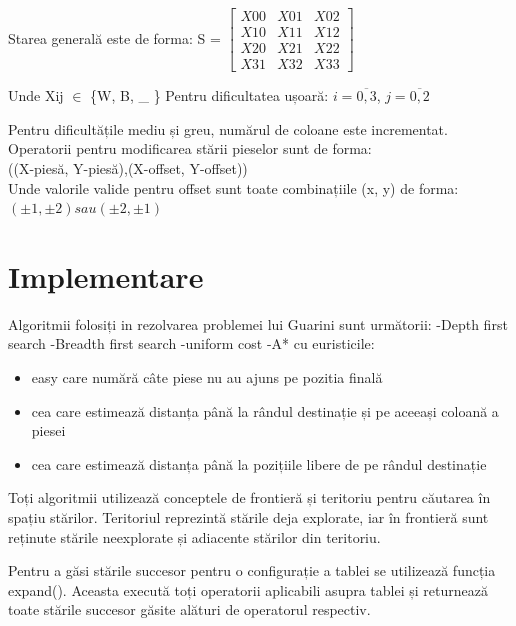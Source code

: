 \documentclass{article}
\begin{document}
    Starea generală este de forma: S =
    $\begin{bmatrix} 
    X00 & X01 & X02\\
    X10 & X11 & X12\\
    X20 & X21 & X22\\
    X31 & X32 & X33
    \end{bmatrix}$
    
    Unde Xij $\in$ \{W, B, \_ \} 
    Pentru dificultatea ușoară: $i=\overline{0,3}$, $j=\overline{0,2}$
    
    \hfill \break
    Pentru dificultățile mediu și greu, numărul de coloane este incrementat.
    \hfill \break
    Operatorii pentru modificarea stării pieselor sunt de forma: 
    \\((X-piesă, Y-piesă),(X-offset, Y-offset))
    \\Unde valorile valide pentru offset sunt toate combinațiile (x, y) de forma: $(\pm1, \pm2) sau (\pm2, \pm1)$  

\section{Implementare}
    Algoritmii folosiți in rezolvarea problemei lui Guarini sunt următorii: \hfill \break
    -Depth first search \hfill \break
    -Breadth first search \hfill \break
    -uniform cost \hfill \break
    -A* cu euristicile: \begin{itemize}
                                        \item easy care numără câte piese nu au ajuns pe pozitia finală
                                        \item cea care estimează distanța până la rândul destinație și pe aceeași coloană a piesei
                                        \item cea care estimează
                         distanța până la pozițiile libere de pe rândul destinație   \end{itemize}
           
    Toți algoritmii utilizează conceptele de frontieră și teritoriu pentru căutarea în spațiu stărilor. Teritoriul reprezintă stările deja explorate, iar în frontieră sunt reținute stările neexplorate și adiacente stărilor din teritoriu. 
    
    Pentru a găsi stările succesor pentru o configurație a tablei se utilizează funcția expand(). Aceasta execută toți operatorii aplicabili asupra tablei și returnează toate stările succesor găsite alături de operatorul respectiv.
    
\end{document}
